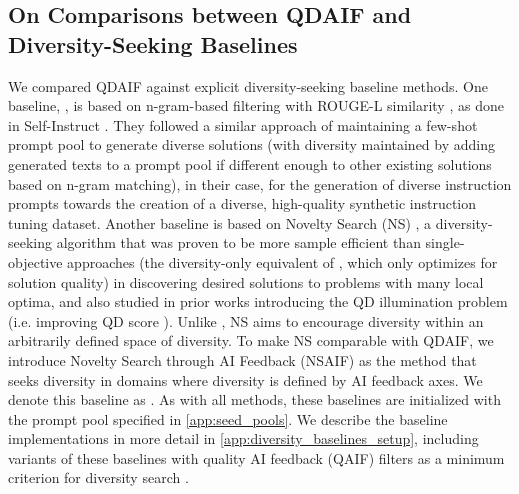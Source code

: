 \subsection{On Comparisons between QDAIF and Diversity-Seeking Baselines}\label{app:diversity_baselines}
We compared QDAIF against explicit diversity-seeking baseline methods. One baseline, \basefive, is based on n-gram-based filtering with ROUGE-L similarity \citep{lin2004rouge}, as done in Self-Instruct \citet{wang2022self}. They followed a similar approach of maintaining a few-shot prompt pool to generate diverse solutions (with diversity maintained by adding generated texts to a prompt pool if different enough to other existing solutions based on n-gram matching), in their case, for the generation of diverse instruction prompts towards the creation of a diverse, high-quality synthetic instruction tuning dataset. Another baseline is based on Novelty Search (NS) \citep{lehman2011abandoning}, a diversity-seeking algorithm that was proven to be more sample efficient than single-objective approaches (the diversity-only equivalent of \basefour, which only optimizes for solution quality) in discovering desired solutions to problems with many local optima, and also studied in prior works introducing the QD illumination problem (i.e. improving QD score \citep{pugh2016quality}). Unlike \basefive, NS aims to encourage diversity within an arbitrarily defined space of diversity. To make NS comparable with QDAIF, we introduce Novelty Search through AI Feedback (NSAIF) as the method that seeks diversity in domains where diversity is defined by AI feedback axes. We denote this baseline as \basesix. As with all methods, these baselines are initialized with the prompt pool specified in \cref{app:seed_pools}. We describe the baseline implementations in more detail in \cref{app:diversity_baselines_setup}, including variants of these baselines with quality AI feedback (QAIF) filters as a minimum criterion for diversity search \citep{lehman2010revising}.

